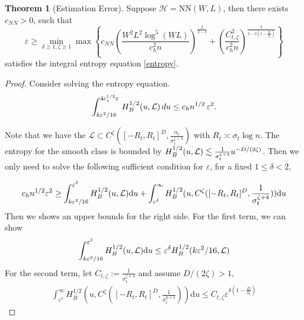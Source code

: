 \documentclass[12pt]{article}
\theoremstyle{definition} %
\newtheorem{theorem}{Theorem}
\begin{document}
\begin{theorem}[Estimation Error]
\label{app:thm-estimation-error}
Suppose $\mathcal{H}=\mathrm{NN}(W,L)$, then there exists $c_{NN}>0$, such that 
\begin{equation}
\varepsilon\geq \min_{\delta\geq 1, \zeta\geq 1}\max\left\{c_{NN}\left(\frac{W^2L^2\log^{5}(WL)}{c^2_hn}\right)^{\frac{2}{2-\delta}} 
+\left( \frac{C^2_{t,\zeta}}{c_h^2n}\right)^{\frac{2}{2-\delta(1-\frac{D}{2\zeta})}}
\right\} 
\end{equation}
satisfies the integral entropy equation \eqref{entropy}.
\end{theorem}

\begin{proof}
Consider solving the entropy equation.
\[
\int_{k\varepsilon^2/16}^{4 c^{1/2}_{v} \varepsilon}\,H_B^{1/2}(u,{\cal L})\,du \leq c_{h} n^{1/2}\,\varepsilon^2.
\]

Note that we have the $\mathcal{L}\subset C^{\zeta}([-R_t,R_t]^{D},\frac{\alpha_t}{\sigma^{\zeta+4}_t})$ with $R_t\asymp \sigma_t\log n$. The entropy for the smooth class is bounded by $H_B^{1/2}(u,{\cal L})\lesssim \frac{1}{\sigma^{\zeta+4}_t}u^{-D/(2\zeta)}$. Then we only need to solve the following sufficient condition for $\varepsilon$, for a fixed $1\leq \delta < 2$,

\begin{align*}
c_{h} n^{1/2} \varepsilon^2\geq \int_{k\varepsilon^2/16}^{\varepsilon^{\delta}}
H_B^{1/2}(u,{\cal L}) \mathrm{d}u + \int_{\varepsilon^{\delta}}^{\infty} H_B^{1/2}(u, C^{\zeta}([-R_t,R_t]^{D},\frac{1}{\sigma^{\zeta+4}_t})) \mathrm{d}u 
\end{align*}
Then we shows an upper bounds for the right side.
For the first term, we can show
\begin{align*}
\int_{k\varepsilon^2/16}^{\varepsilon^{\delta}}
H_B^{1/2}(u,{\cal L}) \mathrm{d}u\leq \varepsilon^{\delta}H_B^{1/2}(k\varepsilon^2/16,{\cal L})
\end{align*}
For the second term, let $C_{t,\zeta}:=\frac{1}{\sigma^{\zeta+4}_t}$ and assume $D/(2\zeta)>1$,
\begin{align*}
\int_{\varepsilon^{\delta}}^{\infty} H_B^{1/2}(u, C^{\zeta}([-R_t,R_t]^{D},\frac{1}{\sigma^{\eta+4}_t})) \mathrm{d}u \leq C_{t,\zeta}\varepsilon^{\delta(1-\frac{D}{2\zeta})}
\end{align*}


\end{proof}
\end{document}
